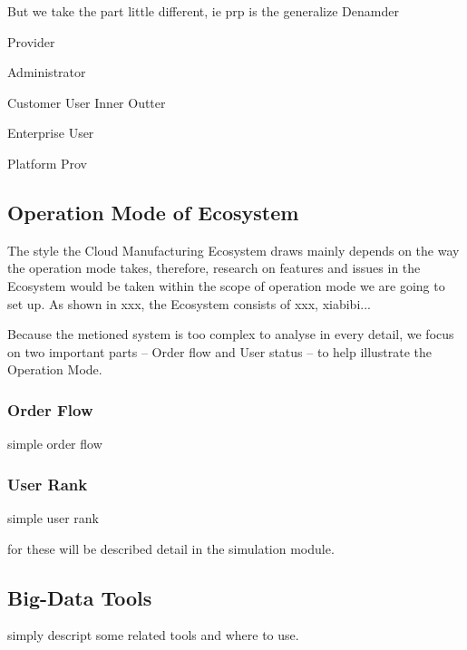 But we take the part little different, ie prp is the generalize
Denamder

Provider

Administrator

Customer User
	Inner
	Outter

Enterprise User

Platform Prov

\subsection{Operation Mode of Ecosystem}
The style the Cloud Manufacturing Ecosystem draws mainly depends on the way the operation mode takes, therefore, research on features and issues in the Ecosystem would be taken within the scope of operation mode we are going to set up. As shown in xxx, the Ecosystem consists of xxx,  xiabibi...

Because the metioned system is too complex to analyse in every detail, we focus on two important parts -- Order flow and User status -- to help illustrate the Operation Mode.

\subsubsection{Order Flow}
simple order flow
\subsubsection{User Rank}
simple user rank

for these will be described detail in the simulation module.
\subsection{Big-Data Tools}
simply descript some related tools and where to use.
